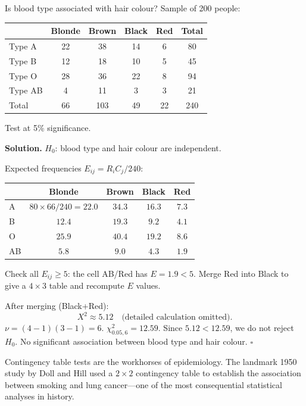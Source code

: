 \documentclass[12pt, a4paper, oneside]{book}
\theoremstyle{definition}
\theoremstyle{plain}
\theoremstyle{remark}
\newenvironment{solution}
  {\par\medskip\noindent\textbf{Solution.}\quad}
  {\hfill$\square$\par\medskip}
\begin{document}
\begin{workedexample}
Is blood type associated with hair colour?  Sample of 200 people:
\begin{center}
\begin{tabular}{lcccc|c}
\toprule
           & Blonde & Brown & Black & Red & Total \\
\midrule
Type A     & 22     & 38    & 14    & 6   & 80 \\
Type B     & 12     & 18    & 10    & 5   & 45 \\
Type O     & 28     & 36    & 22    & 8   & 94 \\[2pt]
Type AB    & 4      & 11    & 3     & 3   & 21 \\
\midrule
Total      & 66     & 103   & 49    & 22  & 240 \\
\bottomrule
\end{tabular}
\end{center}
Test at 5\% significance.

\begin{solution}
$H_0$: blood type and hair colour are independent.

Expected frequencies $E_{ij}=R_i C_j/240$:
\begin{center}
\begin{tabular}{lcccc}
\toprule
  & Blonde & Brown & Black & Red \\
\midrule
A  & $80\times66/240=22.0$ & $34.3$ & $16.3$ & $7.3$ \\
B  & $12.4$ & $19.3$ & $9.2$ & $4.1$ \\
O  & $25.9$ & $40.4$ & $19.2$ & $8.6$ \\
AB & $5.8$ & $9.0$ & $4.3$ & $1.9$ \\
\bottomrule
\end{tabular}
\end{center}

Check all $E_{ij}\ge 5$: the cell AB/Red has $E=1.9<5$.  Merge Red into
Black to give a $4\times3$ table and recompute $E$ values.

After merging (Black+Red):
\[
  X^2 \approx 5.12 \quad \text{(detailed calculation omitted)}.
\]
$\nu=(4-1)(3-1)=6$.  $\chi^2_{0.05,6}=12.59$.  Since $5.12<12.59$, we do
not reject $H_0$.  No significant association between blood type and hair colour.
\end{solution}
\end{workedexample}

\begin{realworld}[: Epidemiology]
Contingency table tests are the workhorses of epidemiology.  The landmark
1950 study by Doll and Hill used a $2\times2$ contingency table to establish
the association between smoking and lung cancer---one of the most consequential
statistical analyses in history.
\end{realworld}
\end{document}
